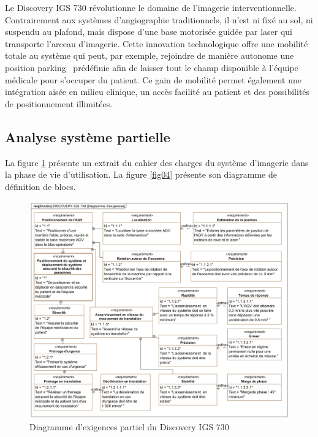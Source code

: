 Le Discovery IGS 730 révolutionne le domaine de l'imagerie interventionnelle. Contrairement aux systèmes d'angiographie traditionnels, il n'est ni fixé au sol, ni suspendu au plafond, mais dispose d'une base motorisée guidée par laser qui transporte l'arceau d'imagerie. Cette innovation technologique offre une mobilité totale au système qui peut, par exemple, rejoindre de manière autonome une position \og parking \fg\ prédéfinie afin de laisser tout le champ disponible à l'équipe médicale pour s'occuper du patient. Ce gain de mobilité permet également une intégration aisée en milieu clinique, un accès facilité au patient et des possibilités de positionnement illimitées.

\vspace{-1cm}

\subsection{Analyse système partielle}

La figure \ref{fig03} présente un extrait du cahier des charges du système d'imagerie dans la phase de vie d'utilisation. La figure \ref{fig04} présente son diagramme de définition de blocs.

\begin{figure}[ht!]
\begin{center}
 \includegraphics[width=0.85\linewidth]{img/fig03}
\end{center}
\caption{Diagramme d'exigences partiel du Discovery IGS 730}
\label{fig03}
\end{figure}

